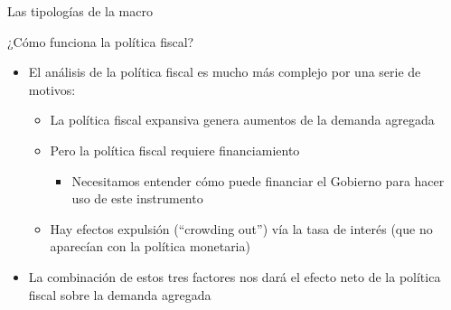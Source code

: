 \documentclass{beamer}
\begin{document}


\begin{frame}{Las tipologías de la macro}
\begin{table}[]
\end{table}

\end{frame}



\begin{frame}{¿Cómo funciona la política fiscal?}
    \begin{itemize}
        \item El análisis de la política fiscal es mucho más complejo por una serie de motivos:
        \begin{itemize}
            \item La política fiscal expansiva genera aumentos de la demanda agregada 
            \item Pero la política fiscal requiere financiamiento
            \begin{itemize}
                \item Necesitamos entender cómo puede financiar el Gobierno para hacer uso de este instrumento
            \end{itemize}
            \item Hay efectos expulsión (“crowding out”) vía la tasa de interés (que no aparecían con la política monetaria)
        \end{itemize}
        \vspace{2mm}
        \item La combinación de estos tres factores nos dará el efecto neto de la política fiscal sobre la demanda agregada
    \end{itemize}
\end{frame}
\end{document}
